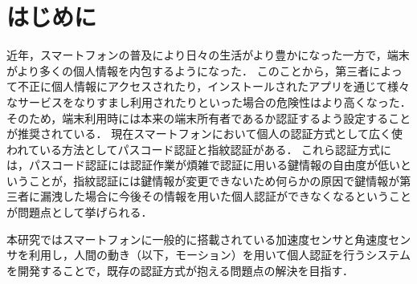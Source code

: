 \section{はじめに}
近年，スマートフォンの普及により日々の生活がより豊かになった一方で，端末がより多くの個人情報を内包するようになった．
このことから，第三者によって不正に個人情報にアクセスされたり，インストールされたアプリを通じて様々なサービスをなりすまし利用されたりといった場合の危険性はより高くなった．
そのため，端末利用時には本来の端末所有者であるか認証するよう設定することが推奨されている．
現在スマートフォンにおいて個人の認証方式として広く使われている方法としてパスコード認証と指紋認証がある．
これら認証方式には，パスコード認証には認証作業が煩雑で認証に用いる鍵情報の自由度が低いということが，指紋認証には鍵情報が変更できないため何らかの原因で鍵情報が第三者に漏洩した場合に今後その情報を用いた個人認証ができなくなるということが問題点として挙げられる．

本研究ではスマートフォンに一般的に搭載されている加速度センサと角速度センサを利用し，人間の動き（以下，モーション）を用いて個人認証を行うシステムを開発することで，既存の認証方式が抱える問題点の解決を目指す．
